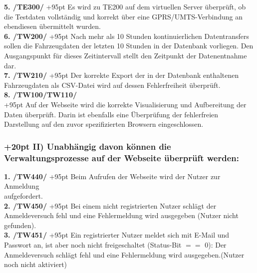 \documentclass[fontsize = 12pt, paper = a4]{scrreprt}
\begin{document}
\textbf{5. /TE300/}
\hangindent+95pt 
\hspace*{8mm}
Es wird zu TE200 auf dem virtuellen Server überprüft, ob die Testdaten vollständig und korrekt über eine GPRS/UMTS-Verbindung an ebendiesen übermittelt wurden. \\
 
\textbf{6. /TW200/}
\hangindent+95pt 
\hspace*{5.5mm} 
Nach mehr als 10 Stunden kontinuierlichen Datentransfers sollen die Fahrzeugdaten der letzten 10 Stunden in der Datenbank vorliegen. Den Ausgangspunkt für dieses Zeitintervall stellt den Zeitpunkt der Datenentnahme dar.\\
 
\textbf{7. /TW210/}
\hangindent+95pt 
\hspace*{5.5mm} 
Der korrekte Export der in der Datenbank enthaltenen Fahrzeugdaten als CSV-Datei wird auf dessen Fehlerfreiheit überprüft.\\

\textbf{8. /TW100/TW110/}\\
\hangindent+95pt 
Auf der Webseite wird die korrekte Visualisierung und Aufbereitung der Daten überprüft. Darin ist ebenfalls eine Überprüfung der fehlerfreien Darstellung auf den zuvor spezifizierten Browsern eingeschlossen. 

\newpage

\subsubsection*{
\hangindent+20pt 
II) Unabhängig davon können die Verwaltungsprozesse auf der Webseite überprüft werden:}

\vspace*{3mm}

\textbf{1. /TW440/}
\hangindent+95pt 
\hspace*{5.5mm}
Beim Aufrufen der Webseite wird der Nutzer zur Anmeldung \\ aufgefordert.\\

\textbf{2. /TW450/}
\hangindent+95pt 
\hspace*{5.5mm}
Bei einem nicht registrierten Nutzer schlägt der Anmeldeversuch fehl und eine Fehlermeldung wird ausgegeben (Nutzer nicht gefunden).\\

\textbf{3. /TW451/}
\hangindent+95pt 
\hspace*{5.5mm}
Ein registrierter Nutzer meldet sich mit E-Mail und Passwort an, ist aber noch nicht freigeschaltet (Status-Bit $==$ 0): Der Anmeldeversuch schlägt fehl und eine Fehlermeldung wird ausgegeben.(Nutzer noch nicht aktiviert)\\
 
\end{document}
